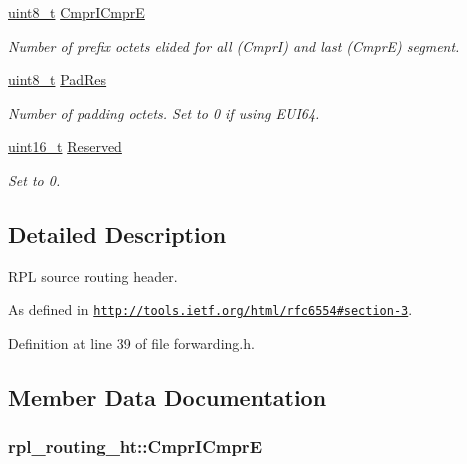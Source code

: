 \begin{DoxyCompactItemize}
\hyperlink{_p_e___types_8h_aba7bc1797add20fe3efdf37ced1182c5}{uint8\+\_\+t} \hyperlink{structrpl__routing__ht_a87f806d7341e70cfab42526feae1fd97}{Cmpr\+I\+CmprE}
\begin{DoxyCompactList}\small\item\em Number of prefix octets elided for all (CmprI) and last (CmprE) segment. \end{DoxyCompactList}\item 
\hyperlink{_p_e___types_8h_aba7bc1797add20fe3efdf37ced1182c5}{uint8\+\_\+t} \hyperlink{structrpl__routing__ht_aa8867cb35ef8f58b70a2645ac1430570}{Pad\+Res}
\begin{DoxyCompactList}\small\item\em Number of padding octets. Set to 0 if using E\+U\+I64. \end{DoxyCompactList}\item 
\hyperlink{_p_e___types_8h_a1f1825b69244eb3ad2c7165ddc99c956}{uint16\+\_\+t} \hyperlink{structrpl__routing__ht_a6a8dea81048a7de7d76a0e500f53b886}{Reserved}
\begin{DoxyCompactList}\small\item\em Set to 0. \end{DoxyCompactList}\end{DoxyCompactItemize}


\subsection{Detailed Description}
R\+PL source routing header. 

As defined in \href{http://tools.ietf.org/html/rfc6554#section-3}{\tt http\+://tools.\+ietf.\+org/html/rfc6554\#section-\/3}. 

Definition at line 39 of file forwarding.\+h.



\subsection{Member Data Documentation}
\subsubsection[{\texorpdfstring{Cmpr\+I\+CmprE}{CmprICmprE}}]{ rpl\+\_\+routing\+\_\+ht\+::\+Cmpr\+I\+CmprE}\hypertarget{structrpl__routing__ht_a87f806d7341e70cfab42526feae1fd97}{}\label{structrpl__routing__ht_a87f806d7341e70cfab42526feae1fd97}


